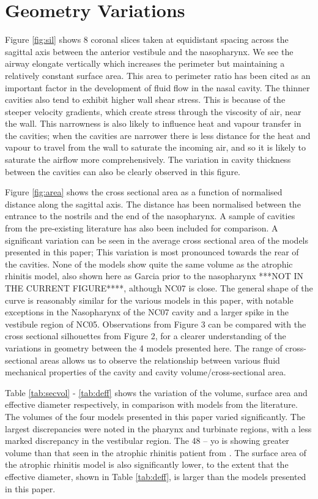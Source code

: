 \section{Geometry Variations}
Figure \ref{fig:sil} shows 8 coronal slices taken at equidistant spacing across the sagittal axis between the anterior vestibule and the nasopharynx. We see the airway elongate vertically which increases the perimeter but maintaining a relatively constant surface area. This area to perimeter ratio has been cited as an important factor in the development of fluid flow in the nasal cavity. The thinner cavities also tend to exhibit higher wall shear stress. This is because of the steeper velocity gradients, which create stress through the viscosity of air, near the wall. This narrowness is also likely to influence heat and vapour transfer in the cavities; when the cavities are narrower there is less distance for the heat and vapour to travel from the wall to saturate the incoming air, and so it is likely to saturate the airflow more comprehensively. The variation in cavity thickness between the cavities can also be clearly observed in this figure.

Figure \ref{fig:area} shows the cross sectional area as a function of normalised distance along the sagittal axis. The distance has been normalised between the entrance to the nostrils and the end of the nasopharynx. A sample of cavities from the pre-existing literature has also been included for comparison. A significant variation can be seen in the average cross sectional area of the models presented in this paper; This variation is most pronounced towards the rear of the cavities. None of the models show quite the same volume as the atrophic rhinitis model, also shown here as Garcia prior to the nasopharynx ***NOT IN THE CURRENT FIGURE****, although NC07 is close. The general shape of the curve is reasonably similar for the various models in this paper, with notable exceptions in the Nasopharynx of the NC07 cavity and a larger spike in the vestibule region of NC05. Observations from Figure 3 can be compared with the cross sectional silhouettes from Figure 2, for a clearer understanding of the variations in geometry between the 4 models presented here. The range of cross-sectional areas allows us to observe the relationship between various fluid mechanical properties of the cavity and cavity volume/cross-sectional area.

Table \ref{tab:secvol} - \ref{tab:deff} shows the variation of the volume, surface area and effective diameter respectively, in comparison with models from the literature. The volumes of the four models presented in this paper varied significantly. The largest discrepancies were noted in the pharynx and turbinate regions, with a less marked discrepancy in the vestibular region. The 48 – yo is showing greater volume than that seen in the atrophic rhinitis patient from \cite{Garcia2007}. The surface area of the atrophic rhinitis model is also significantly lower, to the extent that the effective diameter, shown in Table \ref{tab:deff}, is larger than the models presented in this paper.

